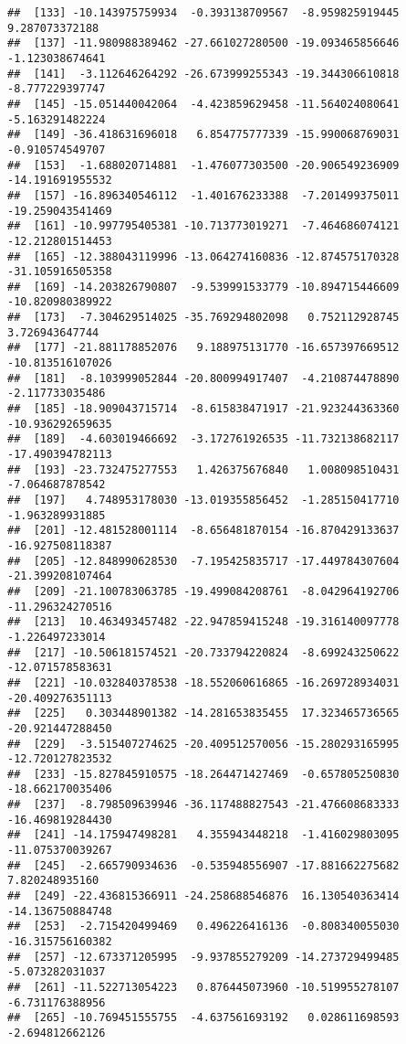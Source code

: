 \documentclass[
]{article}
\begin{document}
\begin{verbatim}
##  [133] -10.143975759934  -0.393138709567  -8.959825919445   9.287073372188
##  [137] -11.980988389462 -27.661027280500 -19.093465856646  -1.123038674641
##  [141]  -3.112646264292 -26.673999255343 -19.344306610818  -8.777229397747
##  [145] -15.051440042064  -4.423859629458 -11.564024080641  -5.163291482224
##  [149] -36.418631696018   6.854775777339 -15.990068769031  -0.910574549707
##  [153]  -1.688020714881  -1.476077303500 -20.906549236909 -14.191691955532
##  [157] -16.896340546112  -1.401676233388  -7.201499375011 -19.259043541469
##  [161] -10.997795405381 -10.713773019271  -7.464686074121 -12.212801514453
##  [165] -12.388043119996 -13.064274160836 -12.874575170328 -31.105916505358
##  [169] -14.203826790807  -9.539991533779 -10.894715446609 -10.820980389922
##  [173]  -7.304629514025 -35.769294802098   0.752112928745   3.726943647744
##  [177] -21.881178852076   9.188975131770 -16.657397669512 -10.813516107026
##  [181]  -8.103999052844 -20.800994917407  -4.210874478890  -2.117733035486
##  [185] -18.909043715714  -8.615838471917 -21.923244363360 -10.936292659635
##  [189]  -4.603019466692  -3.172761926535 -11.732138682117 -17.490394782113
##  [193] -23.732475277553   1.426375676840   1.008098510431  -7.064687878542
##  [197]   4.748953178030 -13.019355856452  -1.285150417710  -1.963289931885
##  [201] -12.481528001114  -8.656481870154 -16.870429133637 -16.927508118387
##  [205] -12.848990628530  -7.195425835717 -17.449784307604 -21.399208107464
##  [209] -21.100783063785 -19.499084208761  -8.042964192706 -11.296324270516
##  [213]  10.463493457482 -22.947859415248 -19.316140097778  -1.226497233014
##  [217] -10.506181574521 -20.733794220824  -8.699243250622 -12.071578583631
##  [221] -10.032840378538 -18.552060616865 -16.269728934031 -20.409276351113
##  [225]   0.303448901382 -14.281653835455  17.323465736565 -20.921447288450
##  [229]  -3.515407274625 -20.409512570056 -15.280293165995 -12.720127823532
##  [233] -15.827845910575 -18.264471427469  -0.657805250830 -18.662170035406
##  [237]  -8.798509639946 -36.117488827543 -21.476608683333 -16.469819284430
##  [241] -14.175947498281   4.355943448218  -1.416029803095 -11.075370039267
##  [245]  -2.665790934636  -0.535948556907 -17.881662275682   7.820248935160
##  [249] -22.436815366911 -24.258688546876  16.130540363414 -14.136750884748
##  [253]  -2.715420499469   0.496226416136  -0.808340055030 -16.315756160382
##  [257] -12.673371205995  -9.937855279209 -14.273729499485  -5.073282031037
##  [261] -11.522713054223   0.876445073960 -10.519955278107  -6.731176388956
##  [265] -10.769451555755  -4.637561693192   0.028611698593  -2.694812662126

\end{verbatim}
\end{document}
